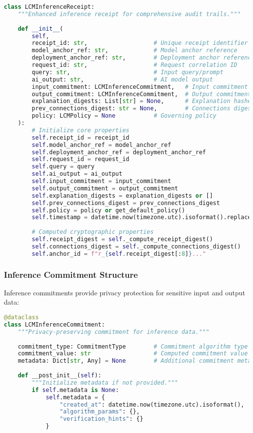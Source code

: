 \documentclass[12pt,a4paper]{article}
\begin{document}
\begin{lstlisting}[language=Python, caption=LCM Inference Receipt Structure]
class LCMInferenceReceipt:
    """Enhanced inference receipt for comprehensive audit trails."""
    
    def __init__(
        self,
        receipt_id: str,                   # Unique receipt identifier
        model_anchor_ref: str,             # Model anchor reference
        deployment_anchor_ref: str,        # Deployment anchor reference
        request_id: str,                   # Request correlation ID
        query: str,                        # Input query/prompt
        ai_output: str,                    # AI model output
        input_commitment: LCMInferenceCommitment,   # Input commitment
        output_commitment: LCMInferenceCommitment,  # Output commitment
        explanation_digests: List[str] = None,      # Explanation hashes
        prev_connections_digest: str = None,        # Connections digest
        policy: LCMPolicy = None           # Governing policy
    ):
        # Initialize core properties
        self.receipt_id = receipt_id
        self.model_anchor_ref = model_anchor_ref
        self.deployment_anchor_ref = deployment_anchor_ref
        self.request_id = request_id
        self.query = query
        self.ai_output = ai_output
        self.input_commitment = input_commitment
        self.output_commitment = output_commitment
        self.explanation_digests = explanation_digests or []
        self.prev_connections_digest = prev_connections_digest
        self.policy = policy or get_default_policy()
        self.timestamp = datetime.now(timezone.utc).isoformat().replace('+00:00', 'Z')
        
        # Computed cryptographic properties
        self.receipt_digest = self._compute_receipt_digest()
        self.connections_digest = self._compute_connections_digest()
        self.anchor_id = f"r_{self.receipt_digest[:8]}..."
\end{lstlisting}

\subsubsection{Inference Commitment Structure}

Inference commitments provide privacy protection for sensitive input and output data:

\begin{lstlisting}[language=Python, caption=Inference Commitment Structure]
@dataclass
class LCMInferenceCommitment:
    """Privacy-preserving commitment for inference data."""
    
    commitment_type: CommitmentType        # Commitment algorithm type
    commitment_value: str                  # Computed commitment value
    metadata: Dict[str, Any] = None        # Additional commitment metadata
    
    def __post_init__(self):
        """Initialize metadata if not provided."""
        if self.metadata is None:
            self.metadata = {
                "created_at": datetime.now(timezone.utc).isoformat(),
                "algorithm_params": {},
                "verification_hints": {}
            }
\end{lstlisting}
\end{document}
